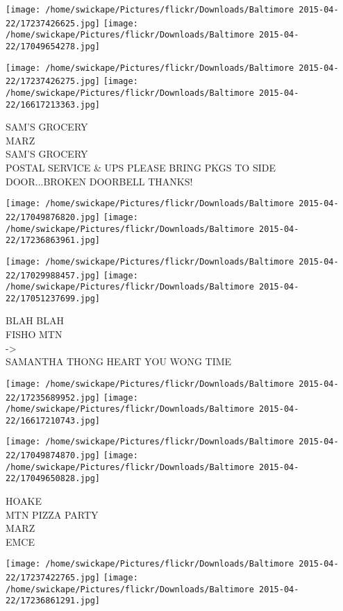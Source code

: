 \documentclass[10pt,letterpaper]{article}
\begin{document}
\texttt{[image: /home/swickape/Pictures/flickr/Downloads/Baltimore 2015-04-22/17237426625.jpg]}
\texttt{[image: /home/swickape/Pictures/flickr/Downloads/Baltimore 2015-04-22/17049654278.jpg]}

\texttt{[image: /home/swickape/Pictures/flickr/Downloads/Baltimore 2015-04-22/17237426275.jpg]}
\texttt{[image: /home/swickape/Pictures/flickr/Downloads/Baltimore 2015-04-22/16617213363.jpg]}

SAM'S GROCERY\\
MARZ\\
SAM'S GROCERY\\
POSTAL SERVICE \& UPS PLEASE BRING PKGS TO SIDE DOOR...BROKEN DOORBELL THANKS!\\
\pagebreak

\texttt{[image: /home/swickape/Pictures/flickr/Downloads/Baltimore 2015-04-22/17049876820.jpg]}
\texttt{[image: /home/swickape/Pictures/flickr/Downloads/Baltimore 2015-04-22/17236863961.jpg]}

\texttt{[image: /home/swickape/Pictures/flickr/Downloads/Baltimore 2015-04-22/17029988457.jpg]}
\texttt{[image: /home/swickape/Pictures/flickr/Downloads/Baltimore 2015-04-22/17051237699.jpg]}

BLAH BLAH\\
FISHO MTN\\
{-}>\\
SAMANTHA THONG HEART YOU WONG TIME\\
\pagebreak

\texttt{[image: /home/swickape/Pictures/flickr/Downloads/Baltimore 2015-04-22/17235689952.jpg]}
\texttt{[image: /home/swickape/Pictures/flickr/Downloads/Baltimore 2015-04-22/16617210743.jpg]}

\texttt{[image: /home/swickape/Pictures/flickr/Downloads/Baltimore 2015-04-22/17049874870.jpg]}
\texttt{[image: /home/swickape/Pictures/flickr/Downloads/Baltimore 2015-04-22/17049650828.jpg]}

HOAKE\\
MTN PIZZA PARTY\\
MARZ\\
EMCE\\
\pagebreak

\texttt{[image: /home/swickape/Pictures/flickr/Downloads/Baltimore 2015-04-22/17237422765.jpg]}
\texttt{[image: /home/swickape/Pictures/flickr/Downloads/Baltimore 2015-04-22/17236861291.jpg]}
\end{document}

